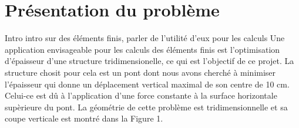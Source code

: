 \documentclass{article}
\begin{document}


    \section{Présentation du problème}
    Intro intro sur des éléments finis, parler de l'utilité d'eux pour les calculs    
    Une application envisageable pour les calculs des éléments finis est l'optimisation d'épaisseur d'une structure tridimensionelle, ce qui est l'objectif de ce projet. La structure chosit pour cela est un pont dont nous avons cherché à minimiser l'épaisseur qui donne un déplacement vertical maximal de son centre de 10 cm. Celui-ce est dû à l'application d'une force constante à la surface horizontale supèrieure du pont. La géométrie de cette problème est tridimensionnelle et sa coupe verticale est montré dans la Figure 1. %
\end{document}
